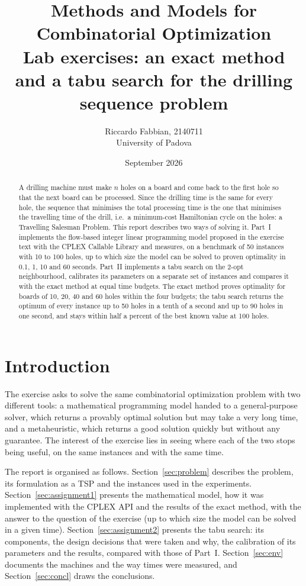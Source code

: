 \documentclass[11pt,a4paper]{article}
\title{Methods and Models for Combinatorial Optimization\\[4pt]
  \large Lab exercises: an exact method and a tabu search for the drilling sequence problem}
\author{Riccardo Fabbian, 2140711\\ University of Padova}
\date{September 2026}
\begin{document}
\maketitle

\begin{abstract}
A drilling machine must make $n$ holes on a board and come back to the first hole so that the
next board can be processed. Since the drilling time is the same for every hole, the sequence
that minimises the total processing time is the one that minimises the travelling time of the
drill, i.e.\ a minimum-cost Hamiltonian cycle on the holes: a Travelling Salesman Problem.
This report describes two ways of solving it. Part~I implements the flow-based integer linear
programming model proposed in the exercise text with the CPLEX Callable Library and measures,
on a benchmark of 50 instances with 10 to 100 holes, up to which size the model can be solved
to proven optimality in 0.1, 1, 10 and 60 seconds. Part~II implements a tabu search on the
2-opt neighbourhood, calibrates its parameters on a separate set of instances and compares it
with the exact method at equal time budgets. The exact method proves optimality for boards of
10, 20, 40 and 60 holes within the four budgets; the tabu search returns the optimum of every
instance up to 50 holes in a tenth of a second and up to 90 holes in one second, and stays
within half a percent of the best known value at 100 holes.
\end{abstract}
\newpage
\tableofcontents
\vspace{2em}

\section{Introduction}
The exercise asks to solve the same combinatorial optimization problem with two different
tools: a mathematical programming model handed to a general-purpose solver, which returns a
provably optimal solution but may take a very long time, and a metaheuristic, which returns a
good solution quickly but without any guarantee. The interest of the exercise lies in seeing
where each of the two stops being useful, on the same instances and with the same time.

The report is organised as follows. Section~\ref{sec:problem} describes the problem, its
formulation as a TSP and the instances used in the experiments. Section~\ref{sec:assignment1}
presents the mathematical model, how it was implemented with the CPLEX API and the results of
the exact method, with the answer to the question of the exercise (up to which size the model
can be solved in a given time). Section~\ref{sec:assignment2} presents the tabu search: its
components, the design decisions that were taken and why, the calibration of its parameters
and the results, compared with those of Part~I. Section~\ref{sec:env} documents the machines
and the way times were measured, and Section~\ref{sec:concl} draws the conclusions.
\end{document}
